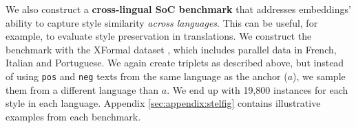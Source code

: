 We also construct a \textbf{cross-lingual SoC benchmark} that addresses embeddings' ability to capture style similarity \textit{across languages}. This can be useful, for example, to evaluate style preservation in translations. We construct the benchmark with the XFormal dataset \citep{briakou-etal-2021-ola}, which includes parallel data in French, Italian and Portuguese. %
We again create triplets as described above, but instead of using {\tt pos} and {\tt neg} texts from the same language as the anchor ($a$), we sample them from a different language than $a$. We end up with 19,800 instances for each style in each language. Appendix \ref{sec:appendix:stelfig} contains illustrative examples from each benchmark.






